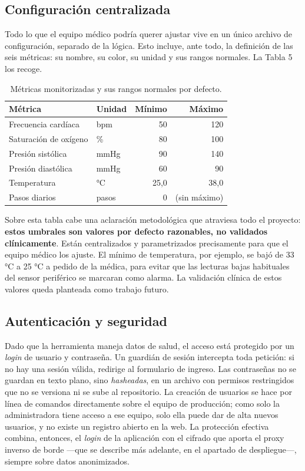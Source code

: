 \subsection{Configuración centralizada}
Todo lo que el equipo médico podría querer ajustar vive en un único archivo de configuración, separado de la lógica. Esto incluye, ante todo, la definición de las seis métricas: su nombre, su color, su unidad y sus rangos normales. La Tabla 5 los recoge.\\


\begin{table}[h!]
\centering
\begin{tabular}{llrr}
\hline
Métrica & Unidad & Mínimo & Máximo \\
\hline
Frecuencia cardíaca & bpm & 50 & 120 \\
Saturación de oxígeno & \% & 80 & 100 \\
Presión sistólica & mmHg & 90 & 140 \\
Presión diastólica & mmHg & 60 & 90 \\
Temperatura & °C & 25,0 & 38,0 \\
Pasos diarios & pasos & 0 & (sin máximo) \\
\hline
\end{tabular}
\caption{Métricas monitorizadas y sus rangos normales por defecto.}
\end{table}
Sobre esta tabla cabe una aclaración metodológica que atraviesa todo el proyecto: \textbf{estos umbrales son valores por defecto razonables, no validados clínicamente}. Están centralizados y parametrizados precisamente para que el equipo médico los ajuste. El mínimo de temperatura, por ejemplo, se bajó de 33 °C a 25 °C a pedido de la médica, para evitar que las lecturas bajas habituales del sensor periférico se marcaran como alarma. La validación clínica de estos valores queda planteada como trabajo futuro.\\


\subsection{Autenticación y seguridad}
Dado que la herramienta maneja datos de salud, el acceso está protegido por un \textit{login} de usuario y contraseña. Un guardián de sesión intercepta toda petición: si no hay una sesión válida, redirige al formulario de ingreso. Las contraseñas no se guardan en texto plano, sino \textit{hasheadas}, en un archivo con permisos restringidos que no se versiona ni se sube al repositorio. La creación de usuarios se hace por línea de comandos directamente sobre el equipo de producción; como solo la administradora tiene acceso a ese equipo, solo ella puede dar de alta nuevos usuarios, y no existe un registro abierto en la web. La protección efectiva combina, entonces, el \textit{login} de la aplicación con el cifrado que aporta el proxy inverso de borde —que se describe más adelante, en el apartado de despliegue—, siempre sobre datos anonimizados.\\



